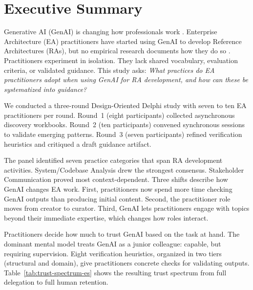 \section*{Executive Summary}

Generative AI (GenAI) is changing how professionals work
\parencite{brynjolfsson_generative_2025, noy_experimental_2023}. Enterprise
Architecture (EA) practitioners have started using GenAI to develop Reference
Architectures (RAs), but no empirical research documents how they do so
\parencite{banh_affordance_genai_ea_2025}. Practitioners experiment in
isolation. They lack shared vocabulary, evaluation criteria, or validated
guidance. This study asks: \textit{What practices do EA practitioners adopt when
using GenAI for RA development, and how can these be systematized into guidance?}

We conducted a three-round Design-Oriented Delphi study
\parencite{skulmoski_delphi_2007} with seven to ten EA practitioners per
round. Round~1 (eight participants) collected asynchronous discovery workbooks.
Round~2 (ten participants) convened synchronous sessions to validate emerging
patterns. Round~3 (seven participants) refined verification heuristics and
critiqued a draft guidance artifact.

The panel identified seven practice categories that span RA development
activities. System/Codebase Analysis drew the strongest consensus. Stakeholder
Communication proved most context-dependent. Three shifts describe how GenAI
changes EA work. First, practitioners now spend more time checking GenAI outputs
than producing initial content. Second, the practitioner role moves from creator
to curator. Third, GenAI lets practitioners engage with topics beyond their
immediate expertise, which changes how roles interact.

Practitioners decide how much to trust GenAI based on the task at hand. The
dominant mental model treats GenAI as a junior colleague: capable, but requiring
supervision. Eight verification heuristics, organized in two tiers (structural
and domain), give practitioners concrete checks for validating outputs.
Table~\ref{tab:trust-spectrum-es} shows the resulting trust spectrum from full
delegation to full human retention.

